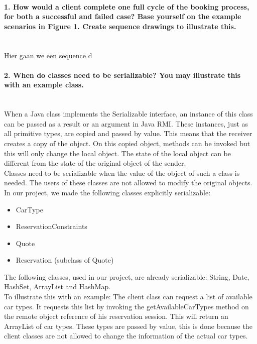 \documentclass{ds-report}
\begin{document}
	\maketitle

	\paragraph{1. How would a client complete one full cycle of the booking process, for both a successful and
failed case? Base yourself on the example scenarios in Figure 1. Create sequence drawings to
illustrate this.} \mbox{}\\
	Hier gaan we een sequence d
	
	\paragraph{2. When do classes need to be serializable? You may illustrate this with an example class.} \mbox{}\\
When a Java class implements the Serializable interface, an instance of this class can be passed as a result or an argument in Java RMI. These instances, just as all primitive types, are copied and passed by value. This means that the receiver creates a copy of the object. On this copied object, methods can be invoked but this will only change the local object. The state of the local object can be different from the state of the original object of the sender. \\
Classes need to be serializable when the value of the object of such a class is needed. The users of these classes are not allowed to modify the original objects. In our project, we made the following classes explicitly serializable:
\begin{itemize}
	\item CarType 
	\item ReservationConstraints 
	\item Quote
	\item Reservation (subclass of Quote)
\end{itemize}
The following classes, used in our project, are already serializable: String, Date, HashSet, ArrayList and HashMap.\\
To illustrate this with an example: The client class can request a list of available car types. It requests this list by invoking the getAvailableCarTypes method on the remote object reference of his reservation session. This will return an ArrayList of car types. These types are passed by value, this is done because the client classes are not allowed to change the information of the actual car types.
\end{document}
